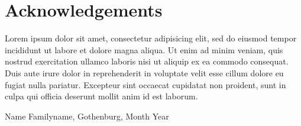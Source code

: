 \thispagestyle{plain}			%
\section*{Acknowledgements}
Lorem ipsum dolor sit amet, consectetur adipisicing elit, sed do eiusmod tempor incididunt ut labore et dolore magna aliqua. Ut enim ad minim veniam, quis nostrud exercitation ullamco laboris nisi ut aliquip ex ea commodo consequat. Duis aute irure dolor in reprehenderit in voluptate velit esse cillum dolore eu fugiat nulla pariatur. Excepteur sint occaecat cupidatat non proident, sunt in culpa qui officia deserunt mollit anim id est laborum.

\vspace{1.5cm}
\hfill
Name Familyname, Gothenburg, Month Year

\newpage				%
\thispagestyle{empty}
\mbox{}